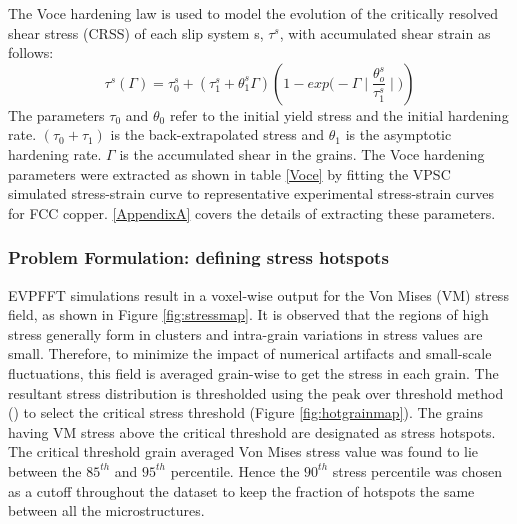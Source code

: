 \documentclass[preprint,1p,times,authoryear]{elsarticle}%
\begin{document}
The  Voce hardening law \cite{voce1955practical} is used to model the evolution of the critically resolved shear stress (CRSS) of each slip system s, $\tau^s$, with accumulated shear strain as follows:
\begin{equation}
\tau^{s}(\Gamma) = \tau^{s}_{0} +(\tau^{s}_{1}+\theta^{s}_{1}\Gamma)\left(1-exp\Big(
-\Gamma\mid \frac{\theta^{s}_{o}}{\tau^{s}_{1}}\mid\Big)\right)
\end{equation}
The parameters $\tau_0$ and $\theta_0$ refer to the initial yield stress and the initial hardening rate. $(\tau_0 + \tau_1)$ is the back-extrapolated stress and $\theta_1$ is the asymptotic hardening rate. $\Gamma$ is the accumulated shear in the grains. The Voce hardening parameters were extracted as shown in table \ref{Voce} by fitting the VPSC simulated stress-strain curve to representative experimental stress-strain curves for FCC copper. \ref{AppendixA} covers the details of extracting these parameters.



\subsubsection{Problem Formulation: defining stress hotspots}
EVPFFT simulations result in a voxel-wise output for the Von Mises (VM) stress field, as shown in Figure \ref{fig:stressmap}. It is observed that the regions of high stress generally form in clusters and intra-grain variations in stress values are small. Therefore, to minimize the impact of numerical artifacts and small-scale fluctuations, this field is averaged grain-wise to get the stress in each grain. The resultant stress distribution is thresholded using the peak over threshold method (\cite{Donegan2013}) to select the critical stress threshold (Figure \ref{fig:hotgrainmap}). The grains having VM stress above the critical threshold are designated as stress hotspots. The critical threshold grain averaged Von Mises stress value was found to lie between the $85^{th}$ and $95^{th}$ percentile. Hence the $90^{th}$ stress percentile was chosen as a cutoff throughout the dataset to keep the fraction of hotspots the same between all the microstructures. 
\end{document}
